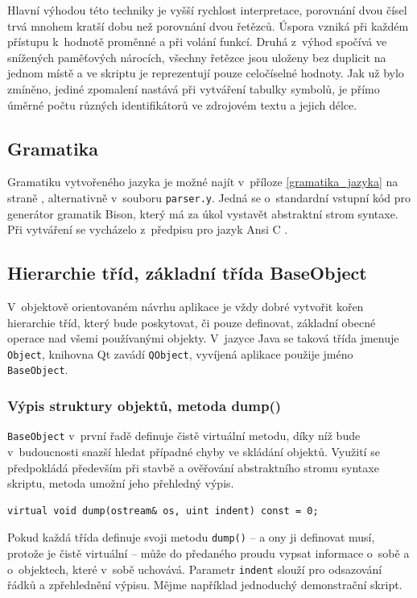 \documentclass[11pt,twoside,a4paper]{book}
\begin{document}
Hlavní výhodou této techniky je vyšší rychlost interpretace, porovnání dvou čísel trvá mnohem kratší dobu než porovnání dvou řetězců. Úspora vzniká při každém přístupu k~hodnotě proměnné a při volání funkcí. Druhá z~výhod spočívá ve snížených paměťových nárocích, všechny řetězce jsou uloženy bez duplicit na jednom místě a ve skriptu je reprezentují pouze celočíselné hodnoty. Jak už bylo zmíněno, jediné zpomalení nastává při vytváření tabulky symbolů, je přímo úměrné počtu různých identifikátorů ve zdrojovém textu a jejich délce.


\subsection{Gramatika}

Gramatiku vytvořeného jazyka je možné najít v~příloze \ref{gramatika_jazyka} na straně \pageref{gramatika_jazyka}, alternativně v~souboru \texttt{parser.y}. Jedná se o~standardní vstupní kód pro generátor gramatik Bison, který má za úkol vystavět abstraktní strom syntaxe. Při vytváření se vycházelo z~předpisu pro jazyk Ansi C \cite{c_grammar}.


\subsection{Hierarchie tříd, základní třída BaseObject}

V~objektově orientovaném návrhu aplikace je vždy dobré vytvořit kořen hierarchie tříd, který bude poskytovat, či pouze definovat, základní obecné operace nad všemi používanými objekty. V~jazyce Java se taková třída jmenuje \texttt{Object}, knihovna Qt zavádí \texttt{QObject}, vyvíjená aplikace použije jméno \texttt{BaseObject}.


\subsubsection{Výpis struktury objektů, metoda dump()}

\texttt{BaseObject} v~první řadě definuje čistě virtuální metodu, díky níž bude v~budoucnosti snazší hledat případné chyby ve skládání objektů. Využití se předpokládá především při stavbě a ověřování abstraktního stromu syntaxe skriptu, metoda umožní jeho přehledný výpis.

\begin{verbatim}
virtual void dump(ostream& os, uint indent) const = 0;
\end{verbatim}

Pokud každá třída definuje svoji metodu \texttt{dump()} -- a ony ji definovat musí, protože je čistě virtuální -- může do předaného proudu vypsat informace o~sobě a o~objektech, které v~sobě uchovává. Parametr \texttt{indent} slouží pro odsazování řádků a zpřehlednění výpisu. Mějme na\-přík\-lad jednoduchý demonstrační skript.
\end{document}
